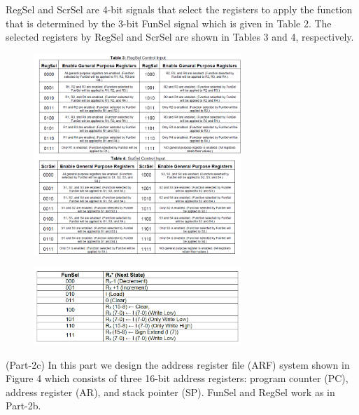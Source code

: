 \documentclass[pdftex,12pt,a4paper]{article}
\begin{document}
RegSel and ScrSel are 4-bit signals that select the registers to apply the function that is determined by the 3-bit FunSel signal which is given in Table 2. The selected registers by RegSel and ScrSel are shown in Tables 3 and 4, respectively. \par
\begin{figure}[htbp]
	\centering
	\includegraphics[width=0.7\textwidth]{Part 2 t3}
\end{figure}
\newpage
\begin{figure}[htbp]
	\centering
	\includegraphics[width=0.7\textwidth]{Part 2 t2}
\end{figure} \par
\newpage
(Part-2c) In this part we design the address register file (ARF) system shown in Figure 4 which consists of three 16-bit address registers: program counter (PC), address register (AR), and stack pointer (SP). FunSel and RegSel work as in Part-2b. \par
\end{document}
